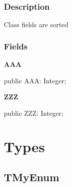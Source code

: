 \documentclass{report}
\newif\ifpdf
\begin{document}
\subsubsection*{\large{\textbf{Description}}\normalsize\hspace{1ex}\hfill}
Class fields are sorted\subsubsection*{\large{\textbf{Fields}}\normalsize\hspace{1ex}\hfill}
\begin{list}{}{
\setlength{\itemindent}{0cm}
\setlength{\listparindent}{0cm}
\setlength{\leftmargin}{\evensidemargin}
\addtolength{\leftmargin}{\tmplength}
\settowidth{\labelsep}{X}
\addtolength{\leftmargin}{\labelsep}
\setlength{\labelwidth}{\tmplength}
}
\label{ok_no_sort.TMyClass-AAA}
\item[\textbf{AAA}\hfill]
\ifpdf
\begin{flushleft}
\fi
\begin{ttfamily}
public AAA: Integer;\end{ttfamily}

\ifpdf
\end{flushleft}
\fi


\par  \label{ok_no_sort.TMyClass-ZZZ}
\item[\textbf{ZZZ}\hfill]
\ifpdf
\begin{flushleft}
\fi
\begin{ttfamily}
public ZZZ: Integer;\end{ttfamily}

\ifpdf
\end{flushleft}
\fi


\par  \end{list}
\section{Types}
\ifpdf
\subsection*{\large{\textbf{TMyEnum}}\normalsize\hspace{1ex}\hrulefill}
\else
\end{document}

